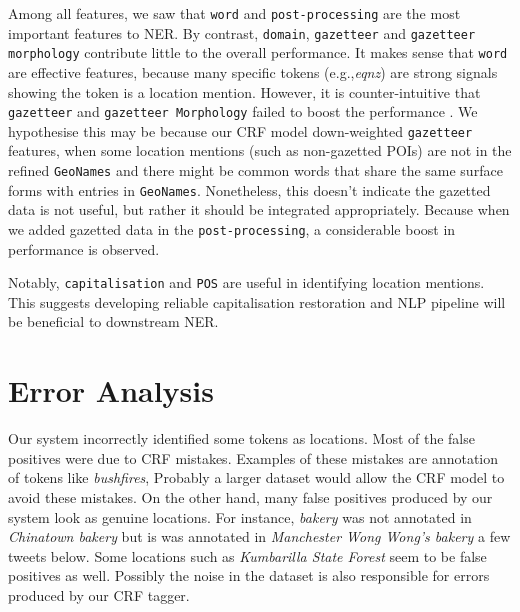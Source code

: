 \documentclass[11pt]{article}
\newcommand{\eg}{e.g.,\xspace}
\newcommand{\geoname}{\texttt{GeoNames}\xspace}
\newcommand{\myex}[1]{\textit{#1}}
\newcommand{\feature}[1]{\texttt{#1}\xspace}
\begin{document}
Among all features, we saw that \feature{word} and \feature{post-processing} are the most important features to NER.
By contrast, \feature{domain}, \feature{gazetteer} and \feature{gazetteer morphology} contribute little to the overall performance.
It makes sense that \feature{word} are effective features, because many specific tokens (\eg \myex{eqnz}) are strong signals showing the token is a location mention.
However, it is counter-intuitive that \feature{gazetteer} and \feature{gazetteer Morphology} failed to boost the performance \cite{conll09rati,acl11liux}.
We hypothesise this may be because our CRF model down-weighted \feature{gazetteer} features, when some location mentions (such as non-gazetted POIs) are not in the refined \geoname and there might be common words that share the same surface forms with entries in \geoname.
Nonetheless, this doesn't indicate the gazetted data is not useful, but rather it should be integrated appropriately.
Because when we added gazetted data in the \feature{post-processing}, a considerable boost in performance is observed.

Notably, \feature{capitalisation} and \feature{POS} are useful in identifying location mentions.
This suggests developing reliable capitalisation restoration and NLP pipeline will be beneficial to downstream NER.

\section{Error Analysis}
\label{sec:error_analysis}

Our system incorrectly identified some tokens as locations.
Most of the false positives were due to CRF mistakes.
Examples of these mistakes are annotation of tokens like \myex{bushfires}, 
Probably a larger dataset would allow the CRF model to avoid these mistakes.
On the other hand, many false positives produced by our system look as genuine locations.
For instance, \myex{bakery} was not annotated in \myex{Chinatown bakery} but is was annotated in \myex{Manchester Wong Wong's bakery} a few tweets below.
Some locations such as \myex{Kumbarilla State Forest} seem to be false positives as well.
Possibly the noise in the dataset is also responsible for errors produced by our CRF tagger.
\end{document}
